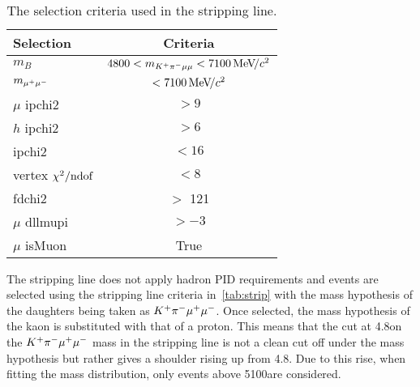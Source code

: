 \begin{table}[h!]
      \centering
  \begin{tabular}{ l | c }
    \hline
    Selection & Criteria \\
    \hline
    $m_{B}$ & $4800 < m_{{{K}^+}{{\pi}^-}\mu\mu} < 7100{\mathrm{\,Me\kern -0.1em V\!/}c^2}$ \\
    $m_{{\mu^+}{\mu^-}}$ & $< 7100{\mathrm{\,Me\kern -0.1em V\!/}c^2}$ \\
    $\mu$ \gls{ipchi2}& $> 9$ \\
    $h$ \gls{ipchi2}& $> 6$ \\
    \B \gls{ipchi2} & $< 16$ \\
    \B vertex $\chi^2/{\mathrm {ndof}}$ & $< 8$ \\
    \B \gls{fdchi2}& $>$ 121\\
    $\mu$ \gls{dllmupi} & $> -3$ \\
    $\mu$ \gls{isMuon} & True \\
         
    \hline
  \end{tabular}
  \caption{The selection criteria used in the stripping line.}
  \label{tab:strip}
  \end{table}
  
The stripping line does not apply hadron PID requirements and events are selected using the stripping line criteria in~\autoref{tab:strip} with the mass hypothesis of the daughters being taken as ${{K}^+}{{\pi}^-}{\mu^+\mu^-}$. Once selected, the mass hypothesis of the kaon is substituted with that of a proton. This means that the cut at 4.8\gevcc on the ${{K}^+}{{\pi}^-}{\mu^+\mu^-}$ mass in the stripping line is not a clean cut off under the \mumuppi mass hypothesis but rather gives a shoulder rising up from 4.8\gevcc. Due to this rise, when fitting the \Lb mass distribution, only events above 5100\mevcc are considered.


